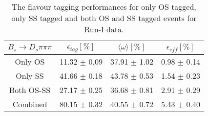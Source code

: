 \begin{table}[h]
\centering
\caption{The flavour tagging performances for only OS tagged, only SS tagged and both OS and SS tagged events for Run-I data.}
\begin{tabular}{c c c c}
\hline
\hline
$ B_s \to D_s \pi \pi \pi$ & $\epsilon_{tag} [\%]$ & $\langle \omega \rangle [\%] $ & $\epsilon_{eff} [\%]$ \\
\hline
Only OS & 11.32 $\pm$ 0.09 & 37.91 $\pm$ 1.02 & 0.98 $\pm$ 0.14\\
Only SS & 41.66 $\pm$ 0.18 & 43.78 $\pm$ 0.53 & 1.54 $\pm$ 0.23\\
Both OS-SS & 27.17 $\pm$ 0.25 & 36.68 $\pm$ 0.81 & 2.91 $\pm$ 0.29\\
\hline
Combined & 80.15 $\pm$ 0.32 & 40.55 $\pm$ 0.72 & 5.43 $\pm$ 0.40\\
\hline
\hline
\end{tabular}
\label{table:tagging_Run1}
\end{table}